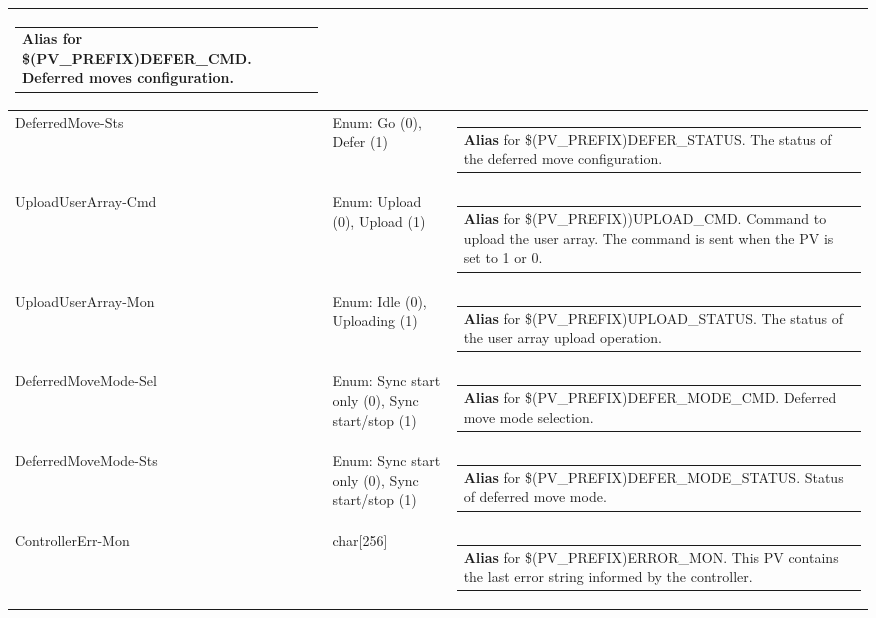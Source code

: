 \documentclass[openany]{article}
\begin{document}
\begin{longtable}{| m{4.5cm} m{2.5cm}  m{8.5cm} |}
\begin{tabular}{@{}m{6cm}@{}}
                \textbf{\color{blue} Alias} for \$(PV\_PREFIX)DEFER\_CMD. Deferred moves configuration.
            \end{tabular} \hypertarget{}{}\\ \hline
        DeferredMove-Sts & Enum: Go (0), Defer (1) & \begin{tabular}{@{}m{6cm}@{}}
                \textbf{\color{blue} Alias} for \$(PV\_PREFIX)DEFER\_STATUS. The status of the deferred move configuration.
            \end{tabular} \hypertarget{pv:upload-user-array-cmd}{}\\ \hline
        UploadUserArray-Cmd & Enum: Upload (0), Upload (1) & \begin{tabular}{@{}m{6cm}@{}}
                \textbf{\color{blue} Alias} for \$(PV\_PREFIX))UPLOAD\_CMD. Command to upload the user array. The command is sent when the PV is set to 1 or 0.
            \end{tabular} \hypertarget{pv:upload-user-array-mon}{}\\ \hline
        UploadUserArray-Mon & Enum: Idle (0), Uploading (1) & \begin{tabular}{@{}m{6cm}@{}}
                \textbf{\color{blue} Alias} for \$(PV\_PREFIX)UPLOAD\_STATUS. The status of the user array upload operation.
            \end{tabular} \hypertarget{pv:deferred-move-mode}{}\\ \hline
        DeferredMoveMode-Sel & Enum: Sync start only (0), Sync start/stop (1) & \begin{tabular}{@{}m{6cm}@{}}
                \textbf{\color{blue} Alias} for \$(PV\_PREFIX)DEFER\_MODE\_CMD. Deferred move mode selection.
            \end{tabular} \hypertarget{}{}\\ \hline
        DeferredMoveMode-Sts & Enum: Sync start only (0), Sync start/stop (1) & \begin{tabular}{@{}m{6cm}@{}}
                \textbf{\color{blue} Alias} for \$(PV\_PREFIX)DEFER\_MODE\_STATUS. Status of deferred move mode.
            \end{tabular} \hypertarget{pv:controller-err-mon}{}\\ \hline
        ControllerErr-Mon & char[256] & \begin{tabular}{@{}m{6cm}@{}}
                \textbf{\color{blue} Alias} for \$(PV\_PREFIX)ERROR\_MON. This PV contains the last error string informed by the controller.

\end{tabular}
\end{longtable}
\end{document}
